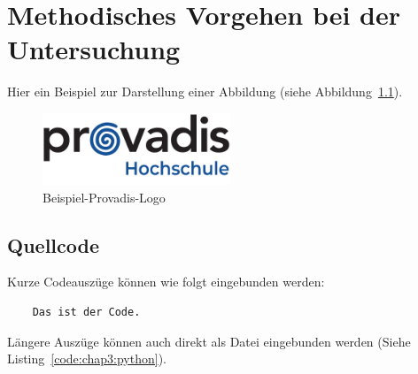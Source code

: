 %

\chapter{Methodisches Vorgehen bei der Untersuchung}

Hier ein Beispiel zur Darstellung einer Abbildung (siehe Abbildung~\ref{fig:chap3:provadis}).
 
\begin{figure}[htb]
	\centering
	\includegraphics[width=0.5\textwidth]{Bilder/Deckblatt/provadis-hochschule.pdf}
	\caption{Beispiel-Provadis-Logo}
	\label{fig:chap3:provadis}
\end{figure}

\section{Quellcode}
Kurze Codeauszüge können wie folgt eingebunden werden:

\begin{lstlisting}
	Das ist der Code.
\end{lstlisting}

Längere Auszüge können auch direkt als Datei eingebunden werden (Siehe Listing~\ref{code:chap3:python}).

